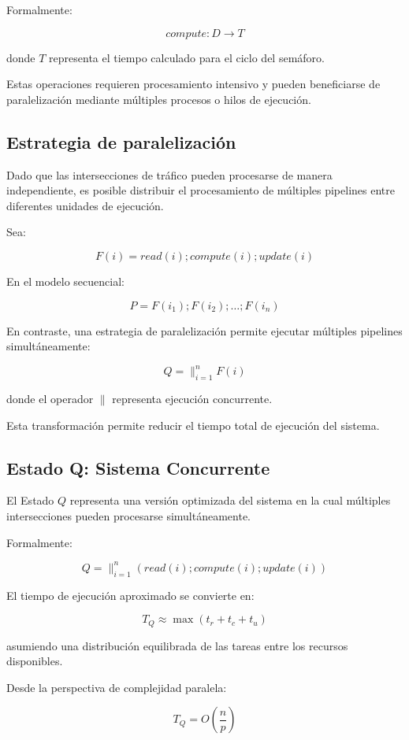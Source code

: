 \documentclass[12pt]{article}
\begin{document}
Formalmente:

\[
compute : D \rightarrow T
\]

donde \(T\) representa el tiempo calculado para el ciclo del semáforo.

Estas operaciones requieren procesamiento intensivo y pueden beneficiarse de paralelización mediante múltiples procesos o hilos de ejecución.

\subsection{Estrategia de paralelización}

Dado que las intersecciones de tráfico pueden procesarse de manera independiente, es posible distribuir el procesamiento de múltiples pipelines entre diferentes unidades de ejecución.

Sea:

\[
F(i) = read(i); compute(i); update(i)
\]

En el modelo secuencial:

\[
P = F(i_1); F(i_2); \dots ; F(i_n)
\]

En contraste, una estrategia de paralelización permite ejecutar múltiples pipelines simultáneamente:

\[
Q = \parallel_{i=1}^{n} F(i)
\]

donde el operador \(\parallel\) representa ejecución concurrente.

Esta transformación permite reducir el tiempo total de ejecución del sistema.

\subsection{Estado Q: Sistema Concurrente}

El Estado \(Q\) representa una versión optimizada del sistema en la cual múltiples intersecciones pueden procesarse simultáneamente.

Formalmente:

\[
Q = \parallel_{i=1}^{n} (read(i); compute(i); update(i))
\]

El tiempo de ejecución aproximado se convierte en:

\[
T_Q \approx \max (t_r + t_c + t_u)
\]

asumiendo una distribución equilibrada de las tareas entre los recursos disponibles.

Desde la perspectiva de complejidad paralela:

\[
T_Q = O\left(\frac{n}{p}\right)
\]
\end{document}
